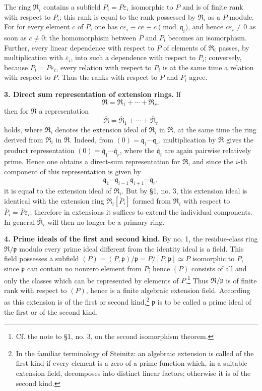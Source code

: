 \documentclass[11pt]{article}
\begin{document}
The ring $\mathfrak R_i$ contains a subfield $P_i=P\varepsilon_i$ isomorphic to $P$ and is of finite rank with respect to $P_i$; this rank is equal to the rank possessed by $\mathfrak R_i$ as a $P$-module. For for every element $c$ of $P$, one has $c\varepsilon_i\equiv ce\equiv c\pmod{\mathfrak q_i}$, and hence $c\varepsilon_i\ne0$ as soon as $c\ne0$; the homomorphism between $P$ and $P_i$ becomes an isomorphism. Further, every linear dependence with respect to $P$ of elements of $\mathfrak R_i$ passes, by multiplication with $\varepsilon_i$, into such a dependence with respect to $P_i$; conversely, because $P_i=P\varepsilon_i$, every relation with respect to $P_i$ is at the same time a relation with respect to $P$. Thus the ranks with respect to $P$ and $P_i$ agree.

\textbf{3. Direct sum representation of extension rings.} If
\[
   \mathfrak R=\mathfrak R_1+\cdots+\mathfrak R_r,
\]
then for $\overline{\mathfrak R}$ a representation
\[
   \overline{\mathfrak R}=\overline{\mathfrak R}_1+\cdots+\overline{\mathfrak R}_r
\]
holds, where $\overline{\mathfrak R}_i$ denotes the extension ideal of $\mathfrak R_i$ in $\overline{\mathfrak R}$, at the same time the ring derived from $\mathfrak R_i$ in $\overline{\mathfrak R}$. Indeed, from $(0)=\mathfrak q_1\cdots\mathfrak q_r$, multiplication by $\overline{\mathfrak R}$ gives the product representation $(0)=\overline{\mathfrak q}_1\cdots\overline{\mathfrak q}_r$, where the $\overline{\mathfrak q}_i$ are again pairwise relatively prime. Hence one obtains a direct-sum representation for $\overline{\mathfrak R}$, and since the $i$-th component of this representation is given by
\[
   \overline{\mathfrak q}_1\cdots \overline{\mathfrak q}_{i-1}\,
   \overline{\mathfrak q}_{i+1}\cdots \overline{\mathfrak q}_r,
\]
it is equal to the extension ideal of $\mathfrak R_i$. But by \S 1, no. 3, this extension ideal is identical with the extension ring $\mathfrak R_i[\overline P_i]$ formed from $\mathfrak R_i$ with respect to $\overline P_i=\overline P\varepsilon_i$; therefore in extensions it suffices to extend the individual components. In general $\overline{\mathfrak R}_i$ will then no longer be a primary ring.

\textbf{4. Prime ideals of the first and second kind.} By no. 1, the residue-class ring $\mathfrak R/\mathfrak p$ modulo every prime ideal different from the identity ideal is a field. This field possesses a subfield $(P)=(P,\mathfrak p)/\mathfrak p=P/[P,\mathfrak p]\simeq P$ isomorphic to $P$, since $\mathfrak p$ can contain no nonzero element from $P$; hence $(P)$ consists of all and only the classes which can be represented by elements of $P$.\footnote{Cf. the note to \S 1, no. 3, on the second isomorphism theorem.} Thus $\mathfrak R/\mathfrak p$ is of finite rank with respect to $(P)$, hence is a finite algebraic extension field. According as this extension is of the first or second kind,\footnote{In the familiar terminology of Steinitz: an algebraic extension is called of the first kind if every element is a zero of a prime function which, in a suitable extension field, decomposes into distinct linear factors; otherwise it is of the second kind.} $\mathfrak p$ is to be called a prime ideal of the first or of the second kind.
\end{document}
